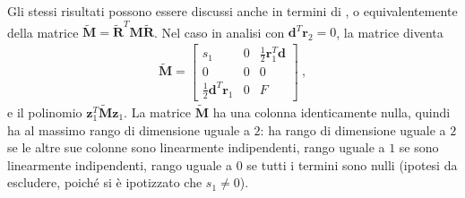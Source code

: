 \documentclass[letterpaper,10pt,italian]{jupyterBook}
\begin{document}
\sphinxAtStartPar
Gli stessi risultati possono essere discussi anche in termini di , o equivalentemente della matrice \(\widetilde{\mathbf{M}} = \widetilde{\mathbf{R}}^T \mathbf{M} \widetilde{\mathbf{R}}\). Nel caso in analisi con \(\mathbf{d}^T \mathbf{r}_2 = 0\), la matrice diventa
\begin{equation*}
\begin{split}\widetilde{\mathbf{M}} = \begin{bmatrix} s_1 & 0 & \frac{1}{2} \mathbf{r}_1^T \mathbf{d} \\ 0 & 0 & 0 \\ \frac{1}{2} \mathbf{d}^T \mathbf{r}_1 & 0 & F \end{bmatrix} \ ,\end{split}
\end{equation*}
\sphinxAtStartPar
e il polinomio \(\mathbf{z}_1^T \widetilde{\mathbf{M}} \mathbf{z}_1\). La matrice \(\widetilde{\mathbf{M}}\) ha una colonna identicamente nulla, quindi ha al massimo rango di dimensione uguale a \(2\): ha rango di dimensione uguale a \(2\) se le altre sue colonne sono linearmente indipendenti, rango uguale a \(1\) se sono linearmente indipendenti, rango uguale a \(0\) se tutti i termini sono nulli (ipotesi da escludere, poiché si è ipotizzato che \(s_1 \ne 0\)).
\end{document}
